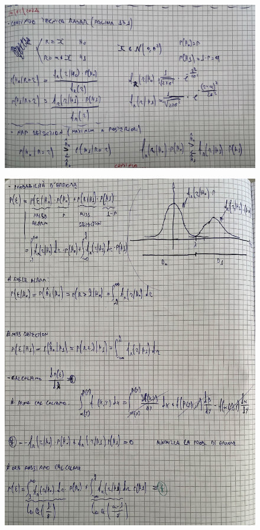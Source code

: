 \documentclass{article}
\begin{document}
\begin{figure}[ht]
\centering
\includegraphics[scale=0.10]{ese/24c.jpeg}
\end{figure} 
\begin{figure}[ht]
\centering
\includegraphics[scale=0.10]{ese/24d.jpeg}
\end{figure} 
\end{document}
